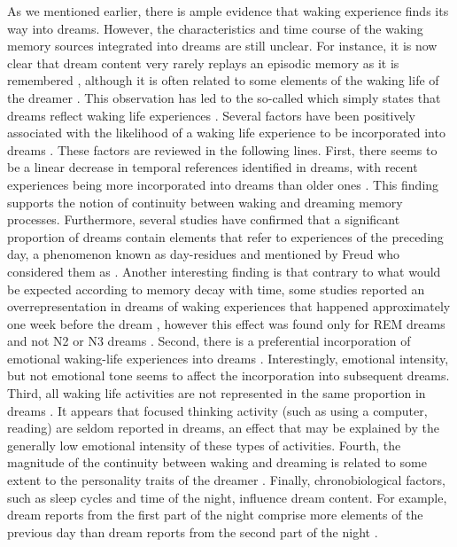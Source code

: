 As we mentioned earlier, there is ample evidence that waking experience finds its way into dreams. However, the characteristics and time course of the waking memory sources integrated into dreams are still unclear. For instance, it is now clear that dream content very rarely replays an episodic memory as it is remembered \citep{fosse_dreaming_2003, nielsen_what_2005}, although it is often related to some elements of the waking life of the dreamer \citep{schredl_characteristics_2010, blagrove_trait_2010, ruby_experimental_2011}. This observation has led to the so-called  which simply states that dreams reflect waking life experiences \citep{schredl_continuity_2003}.
Several factors have been positively associated with the likelihood of a waking life experience to be incorporated into dreams \citep{schredl_characteristics_2010}. These factors are reviewed in the following lines. First, there seems to be a linear decrease in temporal references identified in dreams, with recent experiences being more incorporated into dreams than older ones \citep{botman_dream_1990, strauch_dem_2004, grenier_temporal_2005}. This finding supports the notion of continuity between waking and dreaming memory processes. Furthermore, several studies \citep{botman_dream_1990, nielsen_day-residue_1992, marquardt_empirical_1996} have confirmed that a significant proportion of dreams contain elements that refer to experiences of the preceding day, a phenomenon known as day-residues and mentioned by Freud who considered them as  \citep{freud_interpretation_1900}. Another interesting finding is that contrary to what would be expected according to memory decay with time, some studies reported an overrepresentation in dreams of waking experiences that happened approximately one week before the dream \citep{nielsen_day-residue_1992, marquardt_empirical_1996}, however this effect was found only for REM dreams and not N2 or N3 dreams \citep{blagrove_assessing_2011, van_rijn_dream-lag_2015}. Second, there is a preferential incorporation of emotional waking-life experiences into dreams \citep{malinowski_evidence_2014, schredl_factors_2006}. Interestingly, emotional intensity, but not emotional tone seems to affect the incorporation into subsequent dreams. Third, all waking life activities are not represented in the same proportion in dreams \citep{hartmann_we_1996, schredl_continuity_2000}. It appears that focused thinking activity (such as using a computer, reading) are seldom reported in dreams, an effect that may be explained by the generally low emotional intensity of these types of activities. Fourth, the magnitude of the continuity between waking and dreaming is related to some extent to the personality traits of the dreamer \citep{schredl_dreaming_1996}. Finally, chronobiological factors, such as sleep cycles and time of the night, influence dream content. For example, dream reports from the first part of the night comprise more elements of the previous day than dream reports from the second part of the night \citep{roffwarg_effects_1978}.
